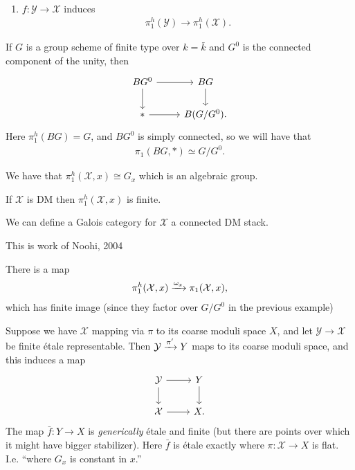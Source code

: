 \documentclass[11pt]{amsart}
\begin{document}
\begin{remark} \,
\begin{enumerate}
    \item $f\colon \mathcal{Y} \to \mathcal{X}$ induces
    \begin{align*}
        \pi_1^h(\mathcal{Y}) \to \pi_1^h(\mathcal{X}).
    \end{align*}
\end{enumerate}
\end{remark}

\begin{example} If $G$ is a group scheme of finite type over $k=\bar{k}$ and $G^0$ is the connected component of the unity, then
\[ \begin{tikzcd}
    BG^0\dar\rar & BG\dar\\
    \ast\rar & B(G/G^0).
\end{tikzcd} \]
Here $\pi_1^h(BG) = G$, and $BG^0$ is simply connected, so we will have that
\begin{align*}
    \pi_1(BG,\ast) \simeq G/G^0.
\end{align*}
\end{example}

\begin{remark} We have that $\pi_1^h(\mathcal{X},x) \cong G_x$ which is an algebraic group.
\end{remark}

\begin{remark} If $\mathcal{X}$ is DM then $\pi_1^h(\mathcal{X},x)$ is finite.
\end{remark}

\begin{definition} We can define a Galois category for $\mathcal{X}$ a connected DM stack.
\end{definition}

This is work of Noohi, 2004

There is a map
\begin{align*}
    \pi_1^h(\mathcal{X},x) \xrightarrow{\omega_x} \pi_1(\mathcal{X},x),
\end{align*}
which has finite image (since they factor over $G/G^0$ in the previous example)

Suppose we have $\mathcal{X}$ mapping via $\pi$ to its coarse moduli space $X$, and let $\mathcal{Y} \to \mathcal{X}$ be finite \'etale representable. Then $\mathcal{Y} \xrightarrow{\pi'} Y$ maps to its coarse moduli space, and this induces a map
\[ \begin{tikzcd}
    \mathcal{Y}\rar\dar & Y\dar\\
    \mathcal{X}\rar & X.
\end{tikzcd} \]
The map $\bar{f} \colon Y \to X$ is \textit{generically} \'etale and finite (but there are points over which it might have bigger stabilizer). Here $\bar{f}$ is \'etale exactly where $\pi \colon \mathcal{X} \to X$ is flat. I.e. ``where $G_x$ is constant in $x$.''
\end{document}
